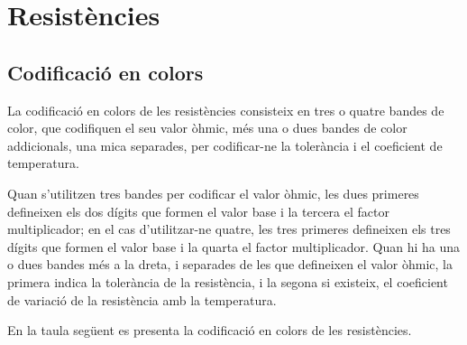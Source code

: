 \chapter{Resistències}\label{chap:resistencies}

\section{Codificació en colors} 

La codificació en colors  de les resistències
consisteix en tres o quatre bandes de color, que codifiquen el seu valor òhmic, més una o dues bandes de color addicionals, una mica separades, per codificar-ne la tolerància i el coeficient de temperatura.

Quan s'utilitzen tres bandes per codificar  el valor òhmic, les dues primeres defineixen els dos dígits que formen el valor
base i la tercera el factor  multiplicador; en el cas d'utilitzar-ne quatre, les tres primeres defineixen els tres dígits que formen el valor base i la quarta  el factor multiplicador. Quan hi ha una o dues bandes més a la dreta, i separades de les que defineixen el valor òhmic, la primera indica la tolerància de la resistència, i la segona si existeix, el coeficient de variació de la resistència  amb la temperatura.

En la taula següent es presenta la codificació en colors de les resistències.


